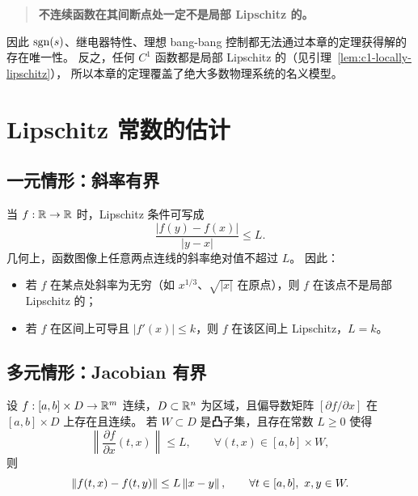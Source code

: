 \begin{quote}
\textbf{不连续函数在其间断点处一定不是局部 Lipschitz 的。}
\end{quote}

因此 $\operatorname{sgn}(s)$、继电器特性、理想 bang-bang 控制都无法通过本章的定理获得解的存在唯一性。
反之，任何 $C^1$ 函数都是局部 Lipschitz 的（见引理~\ref{lem:c1-locally-lipschitz}），
所以本章的定理覆盖了绝大多数物理系统的名义模型。

\section{Lipschitz 常数的估计}\label{sec:lipschitz-constant}

\subsection{一元情形：斜率有界}

当 $f:\mathbb{R}\to\mathbb{R}$ 时，Lipschitz 条件可写成
\begin{equation}
  \frac{|f(y)-f(x)|}{|y-x|}\le L .
\end{equation}
几何上，函数图像上任意两点连线的斜率绝对值不超过 $L$。
因此：
\begin{itemize}
  \item 若 $f$ 在某点处斜率为无穷（如 $x^{1/3}$、$\sqrt{|x|}$ 在原点），则 $f$ 在该点不是局部 Lipschitz 的；
  \item 若 $f$ 在区间上可导且 $|f'(x)|\le k$，则 $f$ 在该区间上 Lipschitz，$L=k$。
\end{itemize}

\subsection{多元情形：Jacobian 有界}

\begin{lemma}\label{lem:jacobian-lipschitz}
  设 $f:[a,b]\times D\to\mathbb{R}^m$ 连续，$D\subset\mathbb{R}^n$ 为区域，且偏导数矩阵 $[\partial f/\partial x]$ 在 $[a,b]\times D$ 上存在且连续。
  若 $W\subset D$ 是\textbf{凸}子集，且存在常数 $L\ge 0$ 使得
  \begin{equation}
    \left\|\frac{\partial f}{\partial x}(t,x)\right\|\le L,
    \qquad \forall (t,x)\in[a,b]\times W,
  \end{equation}
  则
  \begin{equation}
    \left\lVert f(t,x)-f(t,y)\right\rVert\le L\left\lVert x-y\right\rVert,
    \qquad \forall t\in[a,b],\ x,y\in W .
  \end{equation}
  \cite[Lemma 3.1]{khalilNonlinearSystems}
\end{lemma}


